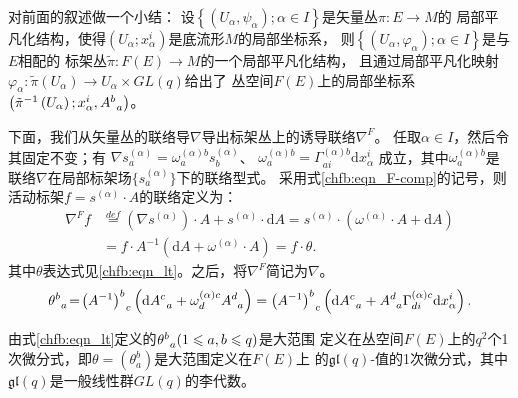 对前面的叙述做一个小结：
设$\left\{\left(U_{\alpha}, \psi_{\alpha}\right) ; \alpha \in I\right\}$是矢量丛$\pi: E \rightarrow M$的
局部平凡化结构，使得$\left(U_{\alpha} ; x_{\alpha}^{i}\right)$是底流形$M$的局部坐标系，
则$\left\{\left(U_{\alpha}, \varphi_{\alpha}\right) ; \alpha \in I\right\}$是与$E$相配的
标架丛$\tilde{\pi}: F(E) \rightarrow M$的一个局部平凡化结构，
且通过局部平凡化映射$\varphi_{\alpha}: \tilde{\pi}\left(U_{\alpha}\right) \rightarrow U_{\alpha} \times GL(q)$给出了
丛空间$F(E)$上的局部坐标系$\left(\tilde{\pi}^{-1}\left(U_{\alpha}\right) ; x_{\alpha}^{i}, A_{\hphantom{a}a}^{b}\right)$。


下面，我们从矢量丛的联络导$\nabla$导出标架丛上的诱导联络$\nabla^F$。
任取$\alpha \in I$，然后令其固定不变；有 
$ \nabla s_{a}^{(\alpha)}=\omega_{a}^{(\alpha) b} s_{b}^{(\alpha)}$、 
$ \omega_{a}^{(\alpha) b}=\Gamma_{a i}^{(\alpha) b} \mathrm{d} x_{\alpha}^{i} $
成立，其中$\omega_{a}^{(\alpha) b}$是联络$\nabla$在局部标架场$\{s_{a}^{(\alpha)}\}$下的联络型式。
采用式\eqref{chfb:eqn_F-comp}的记号，则活动标架$f=s^{(\alpha)} \cdot A$的联络定义为： 
\begin{equation}\label{chfb:eqn_Frame-connection}
\begin{aligned}
    \nabla^F f & \overset{def}{=}\left(\nabla s^{(\alpha)}\right) \cdot A + s^{(\alpha)} \cdot \mathrm{d} A
    =s^{(\alpha)} \cdot \left(\omega^{(\alpha)} \cdot A+\mathrm{d} A\right)  \\
    & =f \cdot A^{-1}\left(\mathrm{d} A+\omega^{(\alpha)} \cdot A\right)
    =f \cdot \theta .    
\end{aligned}\end{equation}
其中$\theta$表达式见\eqref{chfb:eqn_lt}。之后，将$\nabla^F$简记为$\nabla$。
\begin{equation}\label{chfb:eqn_lt}
    \theta_{\hphantom{a}a}^{b}\! =\! \left(A^{-1}\right)_{\hphantom{a}c}^{b}
    \left(\mathrm{d} A_{\hphantom{a}a}^{c}+\omega_{d}^{(\alpha) c} A_{\hphantom{a}a}^{d} \right) 
    =\left(A^{-1}\right)_{\hphantom{a}c}^{b}\left(\mathrm{d} A_{\hphantom{a}a}^{c}+A_{\hphantom{a}a}^{d}
     \Gamma_{d i}^{(\alpha) c} \mathrm{d} x_{\alpha}^{i}\right) .
\end{equation}


\begin{theorem}\label{chfb:thm_ltg}
由式\eqref{chfb:eqn_lt}定义的$\theta_{\hphantom{a}a}^{b} (1 \leqslant a,b \leqslant q)$是大范围
定义在丛空间$F(E)$上的$q^{2}$个1次微分式，即$\theta=(\theta_{a}^{b})$是大范围定义在$F(E)$上
的$\mathfrak{g l}(q)$-值的1次微分式，其中$\mathfrak{gl}(q)$是一般线性群$GL(q)$的李代数。
\end{theorem}

